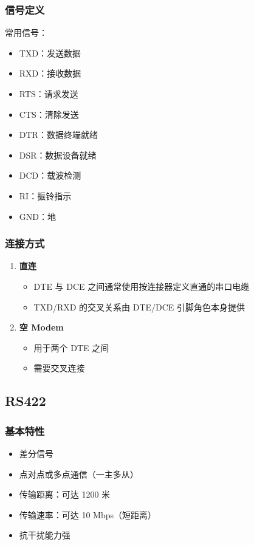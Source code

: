 \subsubsection{信号定义}

常用信号：
\begin{itemize}
  \item TXD：发送数据
  \item RXD：接收数据
  \item RTS：请求发送
  \item CTS：清除发送
  \item DTR：数据终端就绪
  \item DSR：数据设备就绪
  \item DCD：载波检测
  \item RI：振铃指示
  \item GND：地
\end{itemize}

\subsubsection{连接方式}

\begin{enumerate}
  \item \textbf{直连}
    \begin{itemize}
      \item DTE 与 DCE 之间通常使用按连接器定义直通的串口电缆
      \item TXD/RXD 的交叉关系由 DTE/DCE 引脚角色本身提供
    \end{itemize}

  \item \textbf{空 Modem}
    \begin{itemize}
      \item 用于两个 DTE 之间
      \item 需要交叉连接
    \end{itemize}
\end{enumerate}

\subsection{RS422}

\subsubsection{基本特性}

\begin{itemize}
  \item 差分信号
  \item 点对点或多点通信（一主多从）
  \item 传输距离：可达 1200 米
  \item 传输速率：可达 10 Mbps（短距离）
  \item 抗干扰能力强
\end{itemize}

